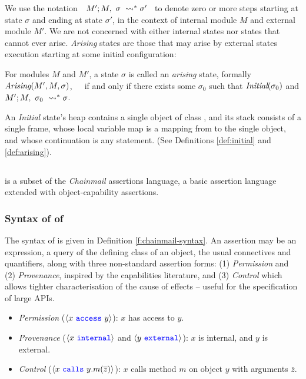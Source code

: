We  use the notation\ \  $M' ; M,\ \sigma\ \leadsto^* \sigma'$ \ 
to denote
zero or more %
steps starting at state $\sigma$ and ending at state $\sigma'$, in the context of internal module 
$M$ and external module $M'$.
We are not concerned with either internal states nor states that cannot ever arise.
\emph{Arising} states are tho\arising{M'}{M}se that  may arise by external states execution
starting at some initial configuration:



\begin{definition}
\label{def:arising}
For   modules $M$ and  $M'$, a %
 state $\sigma$ is 
called an \emph{arising} state, formally \ \ \ $\textit{Arising}(M', M, \sigma)$,\ \ \ 
if and only if there exists some $\sigma_0$ such that $\textit{Initial}(\sigma_0)$ and
$M' ; M,\ \sigma_0\ \leadsto^* \sigma$.
\end{definition}

An \emph{Initial} state's heap
contains a single object of class , and
its  stack   consists of a single frame, whose local variable map is a
mapping from \prg{this} to the single object, and whose continuation is  any statement.
(See Definitions \ref{def:initial} and \ref{def:arising}).

\subsection{\SpecO}
\label{sub:SpecO}

\SpecO is a subset of the \emph{Chainmail} assertions language, \ie
a basic assertion language extended with
object-capability assertions. 


\subsubsection{Syntax of of \SpecO}
The syntax of \SpecO   is given in
Definition \ref{f:chainmail-syntax}.
An assertion may be an expression,   a query of the defining class of
  an object, the usual connectives and quantifiers, along 
with three non-standard assertion forms:
(1) \emph{Permission} and (2) \emph{Provenance}, inspired by the capabilities literature, and
(3) \emph{Control} which allows tighter  characterisation of the cause of effects --  
useful for the specification of large APIs.
\begin{itemize}
\item
\emph{Permission} ($\langle x\ {\color{blue}\texttt{access}}\ y \rangle$):  
  $x$ has access to $y$.
\item
{\emph{Provenance}} ($\langle x\ {\color{blue}\texttt{internal}}\rangle$ and $\langle y\ {\color{blue}\texttt{external}}\rangle$):   $x$ is internal, and $y$ is external.
\item
\emph{Control} ($\langle x\ {\color{blue}\texttt{calls}}\ y.m(\overline{z}) \rangle$): 
$x$ calls method $m$ on object $y$ with arguments $\overline{z}$.
\end{itemize}


